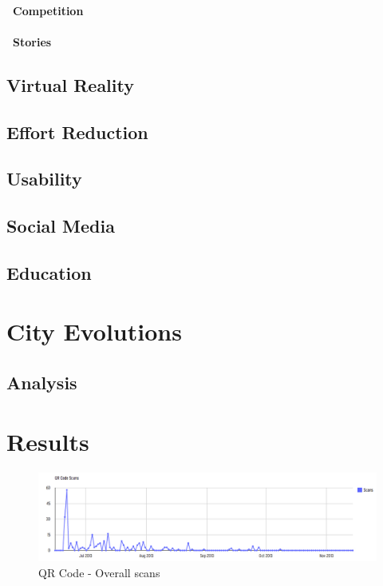 \documentclass[a4paper,12pt]{article}
\begin{document}
\paragraph{\indent~Competition}
\paragraph{\indent~Stories}

\subsection{Virtual Reality}
\subsection{Effort Reduction}
\subsection{Usability}
\subsection{Social Media}
\subsection{Education}
%
\section{City Evolutions}
\subsection{Analysis}
\section{Results}
\begin{figure}[ht!]
	\centering
	\includegraphics[width=150mm]{./images/OverallQRCodeDownload}
	\caption{QR Code - Overall scans}
	\label{QR-overall-access-overTime}
\end{figure}
\end{document}
